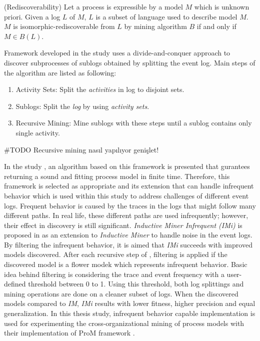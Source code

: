 \theoremstyle{definition}
\begin{definition}{}
(Rediscoverability) Let a process is expressible by a model $M$ which is unknown priori. Given a log $L$ of $M$, $L$ is a subset of language used to describe model $M$. $M$ is isomorphic-rediscoverable from $L$ by mining algorithm $B$ if and only if $M \in B(L)$.
\end{definition}
 
Framework developed in the study \cite{leemans2013discovering} uses a divide-and-conquer approach to discover subprocesses of sublogs obtained by splitting the event log. Main steps of the algorithm are listed as following:
\begin{enumerate}
  \item Activity Sets: Split the \textit{activities} in log to disjoint sets.
  \item Sublogs: Split the \textit{log} by using \textit{activity sets}.
  \item Recursive Mining: Mine sublogs with these steps until a sublog contains only single activity.
\end{enumerate}

#TODO Recursive mining nasıl yapılıyor genişlet!

In the study \cite{leemans2013discovering}, an algorithm based on this framework is presented that gurantees returning a sound and fitting process model in finite time. Therefore, this framework is selected as appropriate and its extension that can handle infrequent behavior which is used within this study to address challenges of different event logs. Frequent behavior is caused by the traces in the logs that might follow many different paths. In real life, these different paths are used infrequently; however, their effect in discovery is still significant. \textit{Inductive Miner Infrequent (IMi)} is proposed in \cite{leemans2014discoveringinfrequent} as an extension to \textit{Inductive Miner} to handle noise in the event logs. By filtering the infrequent behavior, it is aimed that \textit{IMi} succeeds with improved models discovered. After each recursive step of , filtering is applied if the discovered model is a flower modek which represents infrequent behavior. Basic idea behind filtering is considering the trace and event frequency with a user-defined threshold between 0 to 1. Using this threshold, both log splittings and mining operations are done on a cleaner subset of logs. When the discovered models compared to \textit{IM}, \textit{IMi} results with lower fitness, higher precision and equal generalization.
In this thesis study, infrequent behavior capable implementation is used for experimenting the cross-organizational mining of process models with their implementation of ProM framework \cite{verbeek2010prom}.


